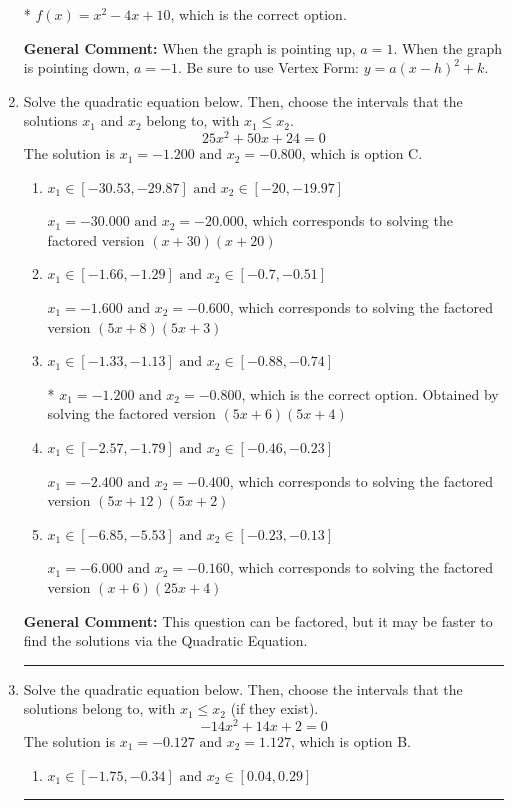 \documentclass{extbook}[14pt]
\newcommand{\litem}[1]{\item #1

\rule{\textwidth}{0.4pt}}
\begin{document}
\begin{enumerate}
{\begin{enumerate}[label=\Alph*.]
* $f(x)=x^{2} -4 x + 10$, which is the correct option.
\end{enumerate}

\textbf{General Comment:} When the graph is pointing up, $a=1$. When the graph is pointing down, $a=-1$. Be sure to use Vertex Form: $y = a(x-h)^2+k$.
}
\litem{
Solve the quadratic equation below. Then, choose the intervals that the solutions $x_1$ and $x_2$ belong to, with $x_1 \leq x_2$.
\[ 25x^{2} +50 x + 24 = 0 \]The solution is \( x_1 = -1.200 \text{ and } x_2 = -0.800 \), which is option C.\begin{enumerate}[label=\Alph*.]
\item \( x_1 \in [-30.53, -29.87] \text{ and } x_2 \in [-20, -19.97] \)

$x_1 = -30.000 \text{ and } x_2 = -20.000$, which corresponds to solving the factored version $(x + 30)(x + 20)$
\item \( x_1 \in [-1.66, -1.29] \text{ and } x_2 \in [-0.7, -0.51] \)

$x_1 = -1.600 \text{ and } x_2 = -0.600$, which corresponds to solving the factored version $(5x + 8)(5x + 3)$
\item \( x_1 \in [-1.33, -1.13] \text{ and } x_2 \in [-0.88, -0.74] \)

* $x_1 = -1.200 \text{ and } x_2 = -0.800$, which is the correct option. Obtained by solving the factored version $(5x + 6)(5x + 4)$
\item \( x_1 \in [-2.57, -1.79] \text{ and } x_2 \in [-0.46, -0.23] \)

$x_1 = -2.400 \text{ and } x_2 = -0.400$, which corresponds to solving the factored version $(5x + 12)(5x + 2)$
\item \( x_1 \in [-6.85, -5.53] \text{ and } x_2 \in [-0.23, -0.13] \)

$x_1 = -6.000 \text{ and } x_2 = -0.160$, which corresponds to solving the factored version $(x + 6)(25x + 4)$
\end{enumerate}

\textbf{General Comment:} This question can be factored, but it may be faster to find the solutions via the Quadratic Equation.
}
\litem{
Solve the quadratic equation below. Then, choose the intervals that the solutions belong to, with $x_1 \leq x_2$ (if they exist).
\[ -14x^{2} +14 x + 2 = 0 \]The solution is \( x_1 = -0.127 \text{ and } x_2 = 1.127 \), which is option B.\begin{enumerate}[label=\Alph*.]
\item \( x_1 \in [-1.75, -0.34] \text{ and } x_2 \in [0.04, 0.29] \)


\end{enumerate}}
\end{enumerate}
\end{document}
